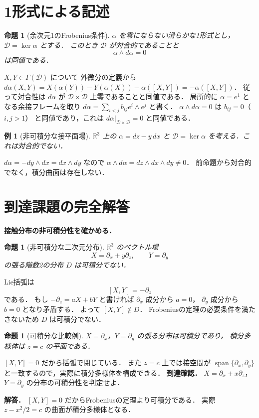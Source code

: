 \documentclass[a5paper,10pt,onecolumn]{jsarticle}
\makeatletter
\theoremstyle{mathnotetheorem}
\newtheorem{proposition}[theorem]{命題}
\newtheorem{example}[theorem]{例}
\renewcommand{\proofname}{証明}
\renewenvironment{proof}[1][\proofname]{%
  \par\pushQED{\qed}\normalfont\topsep4\p@\@plus2\p@\relax
  \trivlist\item[\hskip\labelsep\bfseries #1]\ignorespaces
}{\popQED\endtrivlist\@endpefalse}
\makeatother
\begin{document}
\section{1形式による記述}
\begin{proposition}[余次元1のFrobenius条件]
$\alpha$ を零にならない滑らかな1形式とし，
$\mathcal D=\ker\alpha$ とする．
このとき $\mathcal D$ が対合的であることと
\[
 \alpha\wedge d\alpha=0
\]
は同値である．
\end{proposition}
\begin{proof}
$X,Y\in\Gamma(\mathcal D)$ について
外微分の定義から
$d\alpha(X,Y)=X(\alpha(Y))-Y(\alpha(X))-\alpha([X,Y])
=-\alpha([X,Y])$．
従って対合性は $d\alpha$ が
$\mathcal D\times\mathcal D$ 上零であることと同値である．
局所的に $\alpha=e^1$ となる余接フレームを取り
$d\alpha=\sum_{i<j}b_{ij}e^i\wedge e^j$ と書く．
$\alpha\wedge d\alpha=0$ は $b_{ij}=0$（$i,j>1$）
と同値であり，これは
$d\alpha|_{\mathcal D\times\mathcal D}=0$ と同値である．
\end{proof}
\begin{example}[非可積分な接平面場]
$\mathbb R^3$ 上の $\alpha=dz-y\,dx$ と
$\mathcal D=\ker\alpha$ を考える．これは対合的でない．
\end{example}
\begin{proof}
$d\alpha=-dy\wedge dx=dx\wedge dy$ なので
$\alpha\wedge d\alpha=dz\wedge dx\wedge dy\ne0$．
前命題から対合的でなく，積分曲面は存在しない．
\end{proof}

\section{到達課題の完全解答}
\noindent\textbf{接触分布の非可積分性を確かめる．}
\begin{proposition}[非可積分な二次元分布]
$\mathbb R^3$ のベクトル場
\[
X=\partial_x+y\partial_z,\qquad
Y=\partial_y
\]
の張る階数2の分布 $D$ は可積分でない．
\end{proposition}
\begin{proof}
Lie括弧は
\[
[X,Y]=-\partial_z
\]
である．
もし $-\partial_z=aX+bY$ と書ければ
$\partial_x$ 成分から $a=0$，
$\partial_y$ 成分から $b=0$ となり矛盾する．
よって $[X,Y]\notin D$．
Frobeniusの定理の必要条件を満たさないため
$D$ は可積分でない．
\end{proof}
\begin{proposition}[可積分な比較例]
$X=\partial_x$，$Y=\partial_y$ の張る分布は可積分であり，
積分多様体は $z=c$ の平面である．
\end{proposition}
\begin{proof}
$[X,Y]=0$ だから括弧で閉じている．
また $z=c$ 上では接空間が
$\operatorname{span}\{\partial_x,\partial_y\}$
と一致するので，実際に積分多様体を構成できる．
\end{proof}
\noindent\textbf{到達確認．}
$X=\partial_x+x\partial_z$，
$Y=\partial_y$ の分布の可積分性を判定せよ．
\par\noindent\textbf{解答．}
$[X,Y]=0$ だからFrobeniusの定理より可積分である．
実際 $z-x^2/2=c$ の曲面が積分多様体となる．
\end{document}
